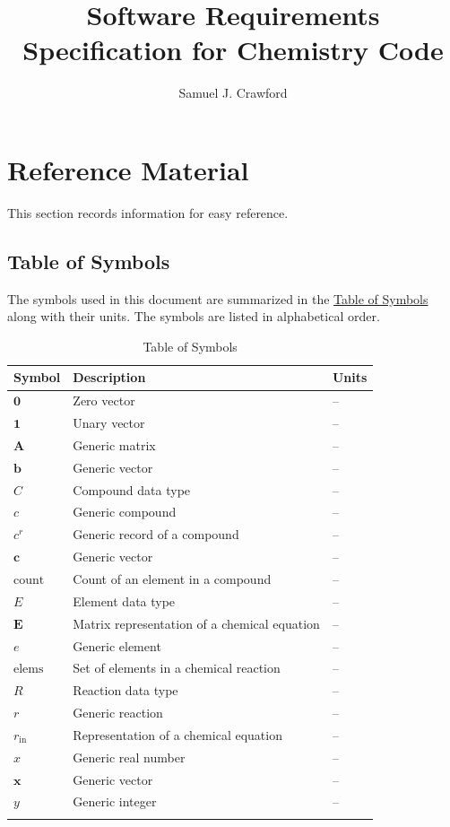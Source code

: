 \documentclass[12pt]{article}
\title{Software Requirements Specification for Chemistry Code}
\author{Samuel J. Crawford}
\begin{document}
\maketitle
\tableofcontents
\newpage
\section{Reference Material}
\label{Sec:RefMat}
This section records information for easy reference.

\subsection{Table of Symbols}
\label{Sec:ToS}
The symbols used in this document are summarized in the \hyperref[Table:ToS]{Table of Symbols} along with their units. The symbols are listed in alphabetical order.

\begin{longtable}{l l l}
\toprule
\textbf{Symbol} & \textbf{Description} & \textbf{Units}
\\
\midrule
\endhead
$\symbf{0}$ & Zero vector & --
\\
$\symbf{1}$ & Unary vector & --
\\
$\symbf{A}$ & Generic matrix & --
\\
$\symbf{b}$ & Generic vector & --
\\
$C$ & Compound data type & --
\\
$c$ & Generic compound & --
\\
${c^{r}}$ & Generic record of a compound & --
\\
$\symbf{c}$ & Generic vector & --
\\
$\text{count}$ & Count of an element in a compound & --
\\
$E$ & Element data type & --
\\
$\symbf{E}$ & Matrix representation of a chemical equation & --
\\
$e$ & Generic element & --
\\
$\text{elems}$ & Set of elements in a chemical reaction & --
\\
$R$ & Reaction data type & --
\\
$r$ & Generic reaction & --
\\
${r_{\text{in}}}$ & Representation of a chemical equation & --
\\
$x$ & Generic real number & --
\\
$\symbf{x}$ & Generic vector & --
\\
$y$ & Generic integer & --
\\
\bottomrule
\caption{Table of Symbols}
\label{Table:ToS}
\end{longtable}
\end{document}
